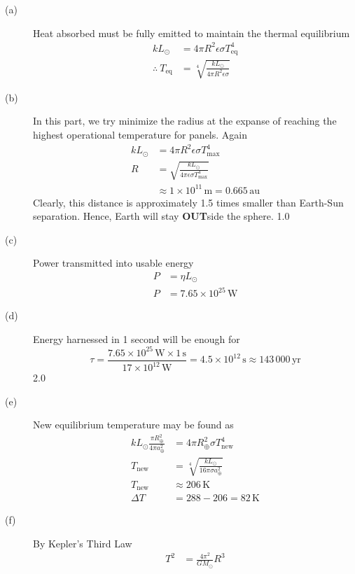 \begin{description}
\item[(a)] Heat absorbed must be fully emitted to maintain the thermal
  equilibrium
  \begin{align*}
  kL_\odot &= 4\pi R^2\epsilon\sigma T_{\mathrm{eq}}^4
    \tag*{2.0}\\
  \therefore\ T_{\mathrm{eq}} &=
    \sqrt[4]{\frac{kL_\odot}{4\pi R^2\epsilon\sigma}}
    \tag*{1.0}
  \end{align*}
\item[(b)] In this part, we try minimize the radius at the expanse of
  reaching the highest operational temperature for panels. Again
  \begin{align*}
  kL_\odot &= 4\pi R^2\epsilon\sigma T_{\max}^4\\
  R &= \sqrt{\frac{kL_\odot}{4\pi\epsilon\sigma T_{\max}^4}}
    \tag*{1.0}\\
  &\approx 1\times10^{11}\,\mathrm{m} = 0.665\,\mathrm{au}
    \tag*{2.0}
  \end{align*}
  Clearly, this distance is approximately 1.5 times smaller than Earth-Sun
  separation. Hence, Earth will stay \textbf{OUT}side the sphere. \hfill 1.0
\item[(c)] Power transmitted into usable energy
  \begin{align*}
  P &= \eta L_\odot\\
  P &= 7.65\times10^{25}\,\mathrm{W}
    \tag*{2.0}
  \end{align*}
\item[(d)] Energy harnessed in 1 second will be enough for
  \[ \tau = \frac{7.65\times10^{25}\,\mathrm{W}\times1\,\mathrm{s}}
       {17\times10^{12}\,\mathrm{W}}
     = 4.5\times10^{12}\,\mathrm{s} \approx 143\,000\,\mathrm{yr} \]
  \hfill 2.0
\item[(e)] New equilibrium temperature may be found as
  \begin{align*}
  kL_\odot\frac{\pi R_\oplus^2}{4\pi a_\oplus^2}
    &= 4\pi R_\oplus^2\sigma T_{\mathrm{new}}^4
    \tag*{2.0}\\
  T_{\mathrm{new}} &= \sqrt[4]{\frac{kL_\odot}{16\pi\sigma a_\oplus^2}}\\
  T_{\mathrm{new}} &\approx 206\,\mathrm{K}
    \tag*{2.0}\\
  \Delta T &= 288 - 206 = 82\,\mathrm{K}
    \tag*{1.0}
  \end{align*}
\item[(f)] By Kepler's Third Law
  \begin{align*}
  T^2 &= \frac{4\pi^2}{GM_\odot}R^3\\

\end{align*}
\end{description}
